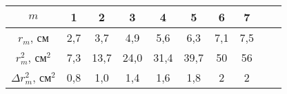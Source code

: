 \begin{tabular}{|c|c|c|c|c|c|c|c|c|c|}
\hline
$m$&1&2&3&4&5&6&7\\
\hline
$r_m$, см&2,7&3,7&4,9&5,6&6,3&7,1&7,5\\
\hline
$r_m^2$, $\text{см}^2$&7,3&13,7&24,0&31,4&39,7&50&56\\
\hline
$\Delta r_m^2$, $\text{см}^2$&0,8&1,0&1,4&1,6&1,8&2&2\\
\hline
\end{tabular}